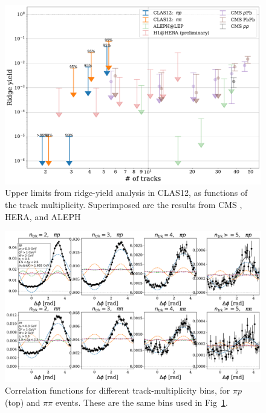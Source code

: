 \begin{figure}
    \centering
    \includegraphics[width=\textwidth]{moneyplot.pdf}
    \caption{Upper limits from ridge-yield analysis in CLAS12, as functions of the track multiplicity.  Superimposed are the results from CMS \cite{Khachatryan:2010gv,CMS:2012qk,Khachatryan:2015lva}, HERA, and ALEPH \cite{Lee:2019tmr}}
    \label{fig:money_plot}
\end{figure}

\begin{figure}
    \centering
    \includegraphics[width=\textwidth]{corrs_vs_ntracks.pdf}
    \caption{Correlation functions for different track-multiplicity bins, for $\pi p$ (top) and $\pi\pi$ events.  These are the same bins used in Fig~\ref{fig:money_plot}.}
    \label{fig:corrs_vs_ntracks}
\end{figure}